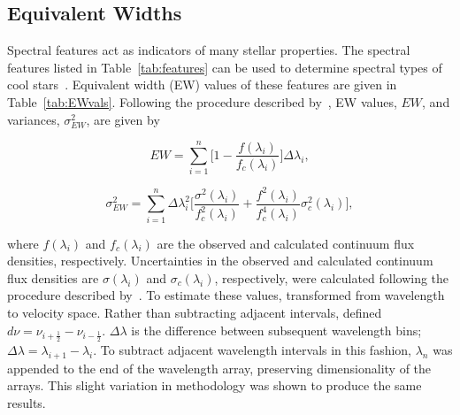 \subsection{Equivalent Widths}

Spectral features act as indicators of many stellar properties.  The 
spectral features listed in Table~\ref{tab:features} 
can be used to determine spectral types of cool 
stars~\cite{Rayner_2009}.  Equivalent width (EW) 
values of these features are given in Table~\ref{tab:EWvals}.  
Following the procedure described by~\cite{Cushing_2005}, EW values, $EW$, and 
variances, $\sigma_{EW}^{2}$, are given by


\begin{equation}\label{eq:EW}
	EW = \sum_{i=1}^{n} \bigg[1 - \frac{f(\lambda_{i})}{f_{c}(\lambda_{i})} \bigg] \Delta\lambda_{i},
\end{equation}

\begin{equation}\label{eq:EWvar}
	\sigma_{EW}^{2} = \sum_{i=1}^{n} \Delta\lambda_{i}^{2} \bigg[ \frac{\sigma^{2}(\lambda_{i})}{f_{c}^{2}(\lambda_{i})} + \frac{f^{2}(\lambda_{i})}{f_{c}^{4}(\lambda_{i})}\sigma_{c}^{2}(\lambda_{i}) \bigg],
\end{equation}


\noindent where $f(\lambda_{i})$ and $f_{c}(\lambda_{i})$ are the observed 
and calculated continuum flux densities, respectively.  Uncertainties in the 
observed and calculated continuum flux densities are $\sigma(\lambda_{i})$ and 
$\sigma_{c}(\lambda_{i})$, respectively, were calculated following the procedure 
described by~\cite{Sembach_1992}.  To estimate these values, \cite{Sembach_1992} 
transformed from wavelength to velocity space.  Rather than subtracting adjacent intervals, 
\cite{Sembach_1992} defined $d\nu = \nu_{i+\frac{1}{2}} - \nu_{i-\frac{1}{2}}$.  
$\Delta\lambda$ is the difference between subsequent wavelength bins; 
$\Delta\lambda = \lambda_{i+1} - \lambda_{i}$.  To subtract adjacent 
wavelength intervals in this fashion, $\lambda_{n}$ was appended to the 
end of the wavelength array, preserving dimensionality of the arrays.  
This slight variation in methodology was shown to produce the same results.



